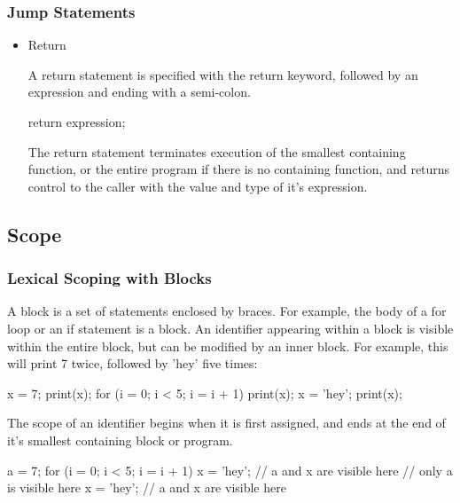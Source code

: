 \documentclass[oneside]{book}
\begin{document}
\subsubsection{Jump Statements}
\begin{itemize}
\item Return

A return statement is specified with the return keyword, followed by an expression and ending with a semi-colon.
\begin{code}
return expression;
\end{code}
The return statement terminates execution of the smallest containing function, or the entire program if there is no containing function, and returns control to the caller with the value and type of it's expression. 

\end{itemize} 

\subsection{Scope}

\subsubsection{Lexical Scoping with Blocks}

A block is a set of statements enclosed by braces. For example, the body of a for loop or an if statement is a block. An identifier appearing within a block is visible within the entire block, but can be modified by an inner block. For example, this will print 7 twice, followed by 'hey' five times:
\begin{mdframed}[hidealllines=true,backgroundcolor=gray!10,skipbelow=.5em,skipabove=.5em]
\begin{code}
x = 7;
print(x);
for (i = 0; i < 5; i = i + 1)
{
  print(x);
  x = 'hey';
}
print(x);
\end{code}
\end{mdframed}
The scope of an identifier begins when it is first assigned, and ends at the end of it's smallest containing block or program.
\begin{mdframed}[hidealllines=true,backgroundcolor=gray!10,skipbelow=.5em,skipabove=.5em]
\begin{code}
a = 7;
for (i = 0; i < 5; i = i + 1)
{
  x = 'hey';
  // a and x are visible here
}
// only a is visible here
x = 'hey';
// a and x are visible here
\end{code}
\end{mdframed}
\end{document}
